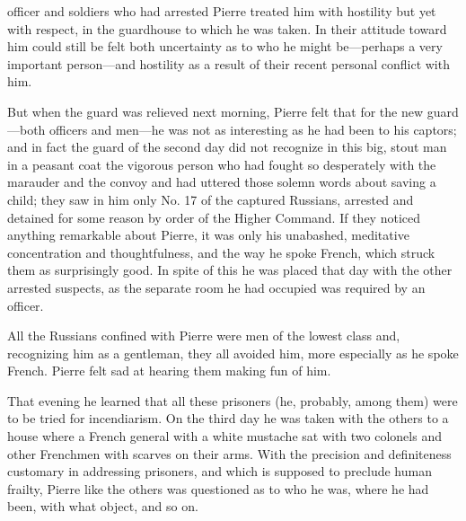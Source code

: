  officer and soldiers who had arrested Pierre treated him with
hostility but yet with respect, in the guardhouse to which he was
taken.  In their attitude toward him could still be felt both
uncertainty as to who he might be---perhaps a very important
person---and hostility as a result of their recent personal
conflict with him.

But when the guard was relieved next morning, Pierre felt that
for the new guard---both officers and men---he was not as
interesting as he had been to his captors; and in fact the guard
of the second day did not recognize in this big, stout man in a
peasant coat the vigorous person who had fought so desperately
with the marauder and the convoy and had uttered those solemn
words about saving a child; they saw in him only No. 17 of the
captured Russians, arrested and detained for some reason by order
of the Higher Command. If they noticed anything remarkable about
Pierre, it was only his unabashed, meditative concentration and
thoughtfulness, and the way he spoke French, which struck them as
surprisingly good. In spite of this he was placed that day with
the other arrested suspects, as the separate room he had occupied
was required by an officer.

All the Russians confined with Pierre were men of the lowest
class and, recognizing him as a gentleman, they all avoided him,
more especially as he spoke French. Pierre felt sad at hearing
them making fun of him.

That evening he learned that all these prisoners (he, probably,
among them) were to be tried for incendiarism. On the third day
he was taken with the others to a house where a French general
with a white mustache sat with two colonels and other Frenchmen
with scarves on their arms.  With the precision and definiteness
customary in addressing prisoners, and which is supposed to
preclude human frailty, Pierre like the others was questioned as
to who he was, where he had been, with what object, and so on.

